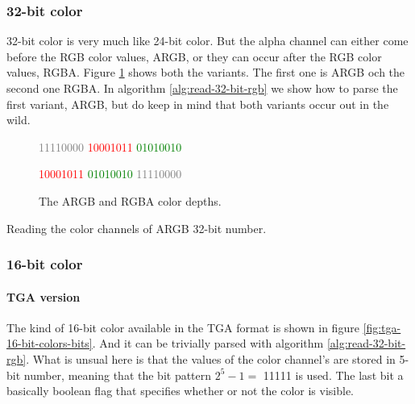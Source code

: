 \begin{refsection}
  \subsubsection{32-bit color}

  32-bit color is very much like 24-bit color. But the alpha channel
  can either come before the RGB color values, ARGB, or
  they can occur after the RGB color values, RGBA. Figure
  \ref{fig:32-bit-colors-bits} shows both the variants. The first one
  is ARGB och the second one RGBA. In algorithm
  \ref{alg:read-32-bit-rgb} we show how to parse the first variant,
  ARGB, but do keep in mind that both variants occur out in the wild.

  \begin{figure}
    \centering
    {\Large%
      \textcolor{gray}{11110000}%
      \textcolor{red}{10001011}%
      \textcolor{green}{01010010}%
      \textcolor{blue}{\fullbyte}

      \textcolor{red}{10001011}%
      \textcolor{green}{01010010}%
      \textcolor{blue}{\fullbyte}%
      \textcolor{gray}{11110000}%
    }

    \caption{The ARGB and RGBA color depths.}
    \label{fig:32-bit-colors-bits}
  \end{figure}

  \begin{algorithm}[H]
    \caption{Reading the color channels of ARGB 32-bit number.}
    \label{alg:read-32-bit-rgb}
    \begin{algorithmic}[1]
    \end{algorithmic}
  \end{algorithm}

  \subsubsection{16-bit color}

  \paragraph{TGA version}

  The kind of 16-bit color available in the TGA format is shown in
  figure \ref{fig:tga-16-bit-colors-bits}. And it can be trivially
  parsed with algorithm \ref{alg:read-32-bit-rgb}. What is unsual here is that the values of the
  color channel's are stored in 5-bit number, meaning that the bit
  pattern $2^5 - 1 =$  11111 is used. The last bit a basically boolean
  flag that specifies whether or not the color is visible.


\end{refsection}
